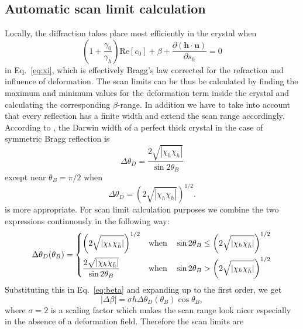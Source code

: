\documentclass[11pt,a4paper]{article}
\begin{document}
\subsection{Automatic scan limit calculation}
Locally, the diffraction takes place most efficiently in the crystal when 
\begin{equation}
\left(1 + \frac{\gamma_0}{\gamma_h}\right) \mathrm{Re} [c_0]  + \beta + \frac{\partial (\mathbf{h}\cdot\mathbf{u}) }{\partial s_h} = 0
\end{equation}
in Eq.~\eqref{eq:xi}, which is effectively Bragg's law corrected for the refraction and influence of deformation. The scan limits can be thus be calculated by finding the maximum and minimum values for the deformation term inside the crystal and calculating the corresponding $\beta$-range. In addition we have to take into account that every reflection has a finite width and extend the scan range accordingly. According to \cite{stepanov_server}, the Darwin width of a perfect thick crystal in the case of symmetric Bragg reflection is
\begin{equation}
\Delta \theta_D = \frac{2 \sqrt{|\chi_h \chi_{\bar{h}}|}}{\sin 2 \theta_B}
\end{equation}
except near $\theta_B = \pi/2$ when 
\begin{equation}
\Delta \theta_D = \left(2 \sqrt{|\chi_h \chi_{\bar{h}}|} \right)^{1/2}.
\end{equation}
is more appropriate. For scan limit calculation purposes we combine the two expressions continuously in the following way:
\begin{equation}
\Delta \theta_D (\theta_B)  = \begin{dcases}
\left(2 \sqrt{|\chi_h \chi_{\bar{h}}|} \right)^{1/2} & \mathrm{when} \quad \sin 2\theta_B \leq \left(2 \sqrt{|\chi_h \chi_{\bar{h}}|} \right)^{1/2}\\
\frac{2 \sqrt{|\chi_h \chi_{\bar{h}}|}}{\sin 2 \theta_B} & \mathrm{when} \quad \sin 2\theta_B > \left(2 \sqrt{|\chi_h \chi_{\bar{h}}|} \right)^{1/2}
\end{dcases}
\end{equation} 
Substituting this in Eq.~\eqref{eq:beta} and expanding up to the first order, we get
\begin{equation}
|\Delta \beta| = \sigma h \Delta \theta_D (\theta_B) \cos \theta_B,
\end{equation}
where $\sigma = 2$ is a scaling factor which makes the scan range look nicer especially in the absence of a deformation field. Therefore the scan limits are
\end{document}
